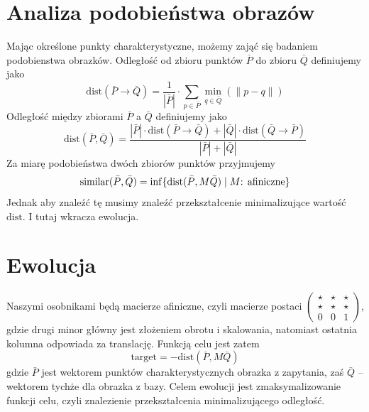 \documentclass[a4paper,12pt,leqno]{article}
\newcommand{\nel}[1]{|#1|}
\newcommand{\dist}{\mathrm{dist}}
\newcommand{\target}{\mathrm{target}}
\begin{document}
\section{Analiza podobieństwa obrazów}

Mając określone punkty charakterystyczne, możemy zająć się badaniem podobienstwa obrazków.
Odległość od zbioru punktów $\bar P$ do zbioru $\bar Q$ definiujemy jako
\[ \dist(\bar P \rightarrow \bar Q) = \frac{1}{\nel{\bar P}} \cdot \sum_{p \in \bar P} \min_{q \in \bar Q}(\|p - q\|) \]
Odległość między zbiorami $\bar P$ a $\bar Q$ definiujemy jako
\[ \dist(\bar P, \bar Q) = \frac{\nel{\bar P} \cdot \dist(\bar P \rightarrow \bar Q) + \nel{\bar Q} \cdot \dist(\bar Q \rightarrow \bar P)}{\nel{\bar P} + \nel{\bar Q}} \]
Za miarę podobieństwa dwóch zbiorów punktów przyjmujemy
\[ \mathrm{similar}(\bar P, \bar Q) = \inf\{\dist(\bar P, M\bar Q) \;\arrowvert\; M\text{: afiniczne}\} \]
Jednak aby znaleźć tę musimy znaleźć przekształcenie minimalizujące wartość $\dist$. I tutaj wkracza ewolucja. 

\section{Ewolucja}
 
Naszymi osobnikami będą macierze afiniczne, czyli macierze postaci
$\begin{pmatrix}
\star & \star & \star \\
\star & \star & \star \\
0 & 0 & 1
\end{pmatrix}$, gdzie drugi minor główny jest złożeniem obrotu i skalowania, natomiast ostatnia kolumna odpowiada za translację.
Funkcją celu jest zatem 
\[ \target = -\dist(\bar P,  M\bar Q) \]
gdzie $\bar P$ jest wektorem punktów charakterystycznych obrazka z zapytania, zaś $\bar Q$ -- wektorem tychże dla obrazka z bazy.
Celem ewolucji jest zmaksymalizowanie funkcji celu, czyli znalezienie przekształcenia minimalizującego odległość.
\end{document}

